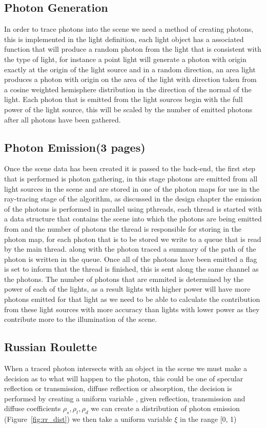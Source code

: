 \subsection{Photon Generation}
In order to trace photons into the scene we need a method of creating photons, this is implemented in the light definition,
each light object has a associated function that will produce a random photon from the light that is consistent with the
type of light, for instance a point light will generate a photon with origin exactly at the origin of the light source and
in a random direction, an area light produces a photon with origin on the area of the light with direction taken from a
cosine weighted hemisphere distribution in the direction of the normal of the light. Each photon that is emitted from the
light sources begin with the full power of the light source, this will be scaled by the number of emitted photons after
all photons have been gathered.

\subsection{Photon Emission(3 pages)}
Once the scene data has been created it is passed to the back-end, the first step that is performed is photon gathering,
in this stage photons are emitted from all light sources in the scene and are stored in one of the photon maps for use
in the ray-tracing stage of the algorithm, as discussed in the design chapter the emission of the photons is performed in
parallel using pthreads, each thread is started with a data structure that contains the scene into which the photons
are being emitted from and the number of photons the thread is responsible for storing in the photon map, for each photon
that is to be stored we write to a queue that is read by the main thread. along with the photon traced a summary of the
path of the photon is written in the queue. Once all of the photons have been emitted a flag is set to inform that the
thread is finished, this is sent along the same channel as the photons. The number of photons that are emmited is determined
by the power of each of the lights, as a result lights with higher power will have more photons emitted for that light as
we need to be able to calculate the contribution from these light sources with more accuracy than lights with lower power
as they contribute more to the illumination of the scene.

\subsection{Russian Roulette}
When a traced photon intersects with an object in the scene we must make a decision as to what will happen to the photon,
this could be one of specular reflection or transmission, diffuse reflection or absorption, the decision is performed
by creating a uniform variable , given reflection, transmission and diffuse coefficients
$\rho_{s}, \rho_{t}, \rho_{d}$ we can create a distribution of photon emission (Figure~\ref{fig:rr_dist}) we then take
a uniform variable $\xi$ in the range [0, 1) 

